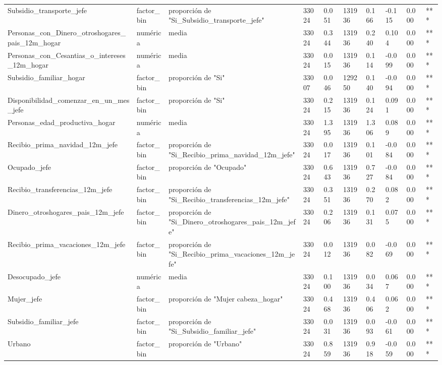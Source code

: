 \begin{longtable}[t]{llllllllll}
Subsidio\_transporte\_jefe & factor\_bin & proporción de "Si\_Subsidio\_transporte\_jefe" & 33024 & 0.051 & 131936 & 0.166 & -0.115 & 0.000 & ***\\
Personas\_con\_Dinero\_otroshogares\_pais\_12m\_hogar & numérica & media & 33024 & 0.344 & 131936 & 0.240 & 0.104 & 0.000 & ***\\
Personas\_con\_Cesantias\_o\_intereses\_12m\_hogar & numérica & media & 33024 & 0.015 & 131936 & 0.114 & -0.099 & 0.000 & ***\\
Subsidio\_familiar\_hogar & factor\_bin & proporción de "Si" & 33007 & 0.046 & 129250 & 0.140 & -0.094 & 0.000 & ***\\
Disponibilidad\_comenzar\_en\_un\_mes\_jefe & factor\_bin & proporción de "Si" & 33024 & 0.215 & 131936 & 0.124 & 0.091 & 0.000 & ***\\
Personas\_edad\_productiva\_hogar & numérica & media & 33024 & 1.395 & 131936 & 1.306 & 0.089 & 0.000 & ***\\
Recibio\_prima\_navidad\_12m\_jefe & factor\_bin & proporción de "Si\_Recibio\_prima\_navidad\_12m\_jefe" & 33024 & 0.017 & 131936 & 0.101 & -0.084 & 0.000 & ***\\
Ocupado\_jefe & factor\_bin & proporción de "Ocupado" & 33024 & 0.643 & 131936 & 0.727 & -0.084 & 0.000 & ***\\
Recibio\_transferencias\_12m\_jefe & factor\_bin & proporción de "Si\_Recibio\_transferencias\_12m\_jefe" & 33024 & 0.351 & 131936 & 0.270 & 0.082 & 0.000 & ***\\
Dinero\_otroshogares\_pais\_12m\_jefe & factor\_bin & proporción de "Si\_Dinero\_otroshogares\_pais\_12m\_jefe" & 33024 & 0.206 & 131936 & 0.131 & 0.075 & 0.000 & ***\\
Recibio\_prima\_vacaciones\_12m\_jefe & factor\_bin & proporción de "Si\_Recibio\_prima\_vacaciones\_12m\_jefe" & 33024 & 0.012 & 131936 & 0.082 & -0.069 & 0.000 & ***\\
Desocupado\_jefe & numérica & media & 33024 & 0.100 & 131936 & 0.034 & 0.067 & 0.000 & ***\\
Mujer\_jefe & factor\_bin & proporción de "Mujer cabeza\_hogar" & 33024 & 0.468 & 131936 & 0.406 & 0.062 & 0.000 & ***\\
Subsidio\_familiar\_jefe & factor\_bin & proporción de "Si\_Subsidio\_familiar\_jefe" & 33024 & 0.031 & 131936 & 0.093 & -0.061 & 0.000 & ***\\
Urbano & factor\_bin & proporción de "Urbano" & 33024 & 0.859 & 131936 & 0.918 & -0.059 & 0.000 & ***\\

\end{longtable}
